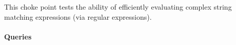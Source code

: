 
This choke point tests the ability of efficiently evaluating complex string
matching expressions (\eg via regular expressions).


\paragraph{Queries}
{\raggedright
}
